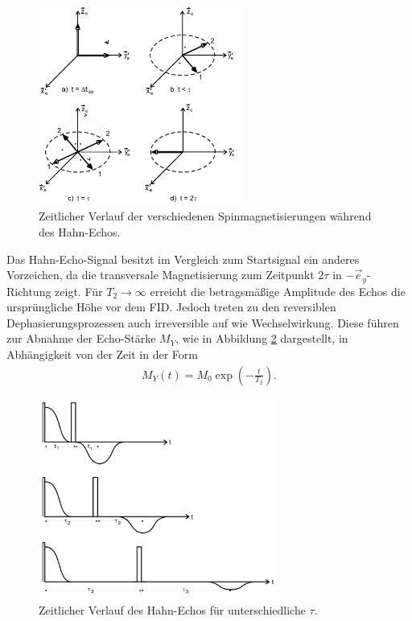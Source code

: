 \begin{figure}
  \centering
  \includegraphics[width=0.6\textwidth]{spin-echo.PNG}
  \caption{Zeitlicher Verlauf der verschiedenen Spinmagnetisierungen während des Hahn-Echos.\cite{sample}}
  \label{fig:spin-echo}
\end{figure}
\FloatBarrier
Das Hahn-Echo-Signal besitzt im Vergleich zum Startsignal
ein anderes Vorzeichen, da die transversale
Magnetisierung zum Zeitpunkt $2\tau$ in $-\vec{e}_y$-Richtung zeigt.
Für $T_2\rightarrow\infty$ erreicht die betragsmäßige
Amplitude des Echos die
ursprüngliche Höhe vor dem FID.
Jedoch treten zu den reversiblen Dephasierungsprozessen auch
irreversible auf wie Wechselwirkung. Diese führen zur Abnahme der Echo-Stärke $M_Y$,
wie in Abbildung \ref{fig:tau_ver} dargestellt,
in Abhängigkeit von der Zeit in der Form
\begin{align}
  M_Y(t)=M_0 \exp\left(-\frac{t}{T_2}\right).\label{eqn:t2}
\end{align}
\FloatBarrier
\begin{figure}
  \centering
  \includegraphics[width=0.7\textwidth]{tau_ver.PNG}
  \caption{Zeitlicher Verlauf des Hahn-Echos für unterschiedliche $\tau$.\cite{sample}}
  \label{fig:tau_ver}
\end{figure}
\FloatBarrier
